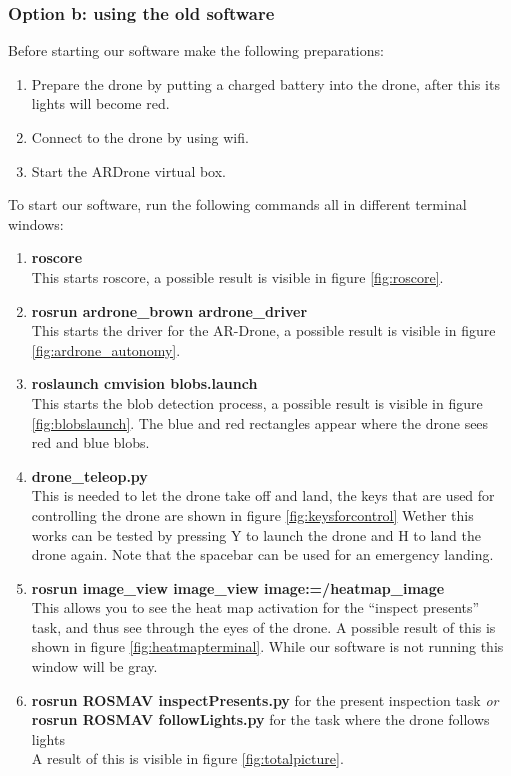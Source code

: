\documentclass[a4paper,10pt]{article}
\begin{document}
\subsubsection{Option b: using the old software}
Before starting our software make the following preparations: 
\begin{enumerate}
	\item Prepare the drone by putting a charged battery into the drone, after this its lights will become red.
	\item Connect to the drone by using wifi. 
	\item Start the ARDrone virtual box.  
\end{enumerate}
To start our software, run the following commands all in different terminal windows:
\begin{enumerate}
\item \textbf{roscore} \\ This starts roscore, a possible result is visible in figure \ref{fig:roscore}.
\item \textbf{rosrun ardrone\_brown ardrone\_driver} \\ This starts the driver for the AR-Drone, a possible result is visible in figure \ref{fig:ardrone_autonomy}.
\item \textbf{roslaunch cmvision blobs.launch} \\ This starts the blob detection process, a possible result is visible in figure \ref{fig:blobslaunch}. The blue and red rectangles appear where the drone sees red and blue blobs. 
\item \textbf{drone\_teleop.py}  \\ This is needed to let the drone take off and land, the keys that are used for controlling the drone are shown in figure \ref{fig:keysforcontrol} Wether this works can be tested by pressing Y to launch the drone and H to land the drone again. Note that the spacebar can be used for an emergency landing.
\item \textbf{rosrun image\_view image\_view image:=/heatmap\_image} \\ This
      allows you to see the heat map activation for the ``inspect presents''
      task, and thus see through the eyes of the drone. A possible result of this is shown in figure \ref{fig:heatmapterminal}. While our software is not running this window will be gray. 
\item \textbf{rosrun ROSMAV inspectPresents.py} for the present inspection task \textit{or} \\
      \textbf{rosrun ROSMAV followLights.py} for the task where the drone follows lights\\
      A result of this is visible in figure \ref{fig:totalpicture}.
\end{enumerate}
\end{document}
